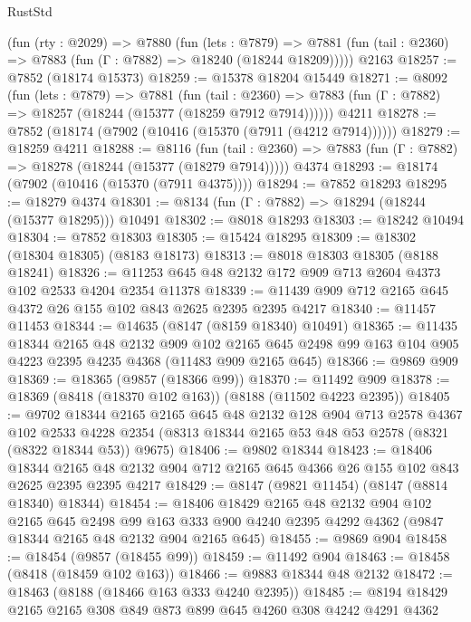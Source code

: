 \begin{lexlean}{RustStd}
\begin{coremodule}
    (fun (rty : @2029) =>
    @7880
      (fun (lets : @7879) =>
      @7881 (fun (tail : @2360) => @7883 (fun (Γ : @7882) => @18240 (@18244 @18209)))))
    @2163
@18257 := @7852 (@18174 @15373)
@18259 := @15378 @18204 @15449
@18271 := @8092
    (fun (lets : @7879) =>
    @7881
      (fun (tail : @2360) =>
      @7883 (fun (Γ : @7882) => @18257 (@18244 (@15377 (@18259 @7912 @7914))))))
    @4211
@18278 := @7852 (@18174 (@7902 (@10416 (@15370 (@7911 (@4212 @7914))))))
@18279 := @18259 @4211
@18288 := @8116
    (fun (tail : @2360) => @7883 (fun (Γ : @7882) => @18278 (@18244 (@15377 (@18279 @7914)))))
    @4374
@18293 := @18174 (@7902 (@10416 (@15370 (@7911 @4375))))
@18294 := @7852 @18293
@18295 := @18279 @4374
@18301 := @8134 (fun (Γ : @7882) => @18294 (@18244 (@15377 @18295))) @10491
@18302 := @8018 @18293
@18303 := @18242 @10494
@18304 := @7852 @18303
@18305 := @15424 @18295
@18309 := @18302 (@18304 @18305) (@8183 @18173)
@18313 := @8018 @18303 @18305 (@8188 @18241)
@18326 := @11253 @645 @48 @2132 @172 @909 @713 @2604 @4373 @102 @2533 @4204 @2354 @11378
@18339 := @11439 @909 @712 @2165 @645 @4372 @26 @155 @102 @843 @2625 @2395 @2395 @4217
@18340 := @11457 @11453
@18344 := @14635 (@8147 (@8159 @18340) @10491)
@18365 := @11435
    @18344
    @2165
    @48
    @2132
    @909
    @102
    @2165
    @645
    @2498
    @99
    @163
    @104
    @905
    @4223
    @2395
    @4235
    @4368
    (@11483 @909 @2165 @645)
@18366 := @9869 @909
@18369 := @18365 (@9857 (@18366 @99))
@18370 := @11492 @909
@18378 := @18369 (@8418 (@18370 @102 @163)) (@8188 (@11502 @4223 @2395))
@18405 := @9702
    @18344
    @2165
    @2165
    @645
    @48
    @2132
    @128
    @904
    @713
    @2578
    @4367
    @102
    @2533
    @4228
    @2354
    (@8313 @18344 @2165 @53 @48 @53 @2578 (@8321 (@8322 @18344 @53)) @9675)
@18406 := @9802 @18344
@18423 := @18406
    @18344
    @2165
    @48
    @2132
    @904
    @712
    @2165
    @645
    @4366
    @26
    @155
    @102
    @843
    @2625
    @2395
    @2395
    @4217
@18429 := @8147 (@9821 @11454) (@8147 (@8814 @18340) @18344)
@18454 := @18406
    @18429
    @2165
    @48
    @2132
    @904
    @102
    @2165
    @645
    @2498
    @99
    @163
    @333
    @900
    @4240
    @2395
    @4292
    @4362
    (@9847 @18344 @2165 @48 @2132 @904 @2165 @645)
@18455 := @9869 @904
@18458 := @18454 (@9857 (@18455 @99))
@18459 := @11492 @904
@18463 := @18458 (@8418 (@18459 @102 @163))
@18466 := @9883 @18344 @48 @2132
@18472 := @18463 (@8188 (@18466 @163 @333 @4240 @2395))
@18485 := @8194 @18429 @2165 @2165 @308 @849 @873 @899 @645 @4260 @308 @4242 @4291 @4362

\end{coremodule}
\end{lexlean}
